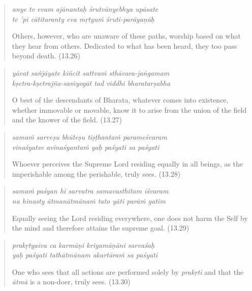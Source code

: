 \documentclass[12pt, twoside, openright]{memoir}
\begin{document}
\par
\begin{verse}
\textit{anye tv evam ajānantaḥ śrutvānyebhya upāsate} \\
\textit{te ’pi cātitaranty eva mṛtyuṁ śruti-parāyaṇāḥ}

\noindent Others, however, who are unaware of these paths, worship based on what they hear from others. Dedicated to what has been heard, they too pass beyond death. (13.26)
\end{verse}
\par



\par
\begin{verse}
\textit{yāvat sañjāyate kiñcit sattvaṁ sthāvara-jaṅgamam} \\
\textit{kṣetra-kṣetrajña-saṁyogāt tad viddhi bharatarṣabha}

\noindent O best of the descendants of Bharata, whatever comes into existence, whether immovable or movable, know it to arise from the union of the field and the knower of the field. (13.27)
\end{verse}
\par



\par
\begin{verse}
\textit{samaṁ sarveṣu bhūteṣu tiṣṭhantaṁ parameśvaram} \\
\textit{vinaśyatsv avinaśyantaṁ yaḥ paśyati sa paśyati}

\noindent Whoever perceives the Supreme Lord residing equally in all beings, as the imperishable among the perishable, truly sees. (13.28)
\end{verse}
\par



\par
\begin{verse}
\textit{samaṁ paśyan hi sarvatra samavasthitam īśvaram} \\
\textit{na hinasty ātmanātmānaṁ tato yāti parāṁ gatim}

\noindent Equally seeing the Lord residing everywhere, one does not harm the Self by the mind and therefore attains the supreme goal. (13.29)
\end{verse}
\par



\par
\begin{verse}
\textit{prakṛtyaiva ca karmāṇi kriyamāṇāni sarvaśaḥ} \\
\textit{yaḥ paśyati tathātmānam akartāraṁ sa paśyati}

\noindent One who sees that all actions are performed solely by \textit{prakṛti} and that the \textit{ātmā} is a non-doer, truly sees. (13.30)
\end{verse}
\par
\end{document}
